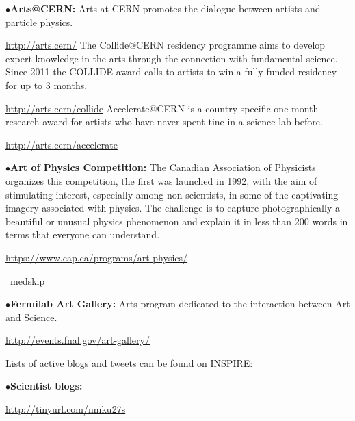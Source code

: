 

\medskip

\item{$\bullet$}{\bf Arts@CERN:}
Arts at CERN promotes the dialogue between artists and particle physics.
	\item{}\qquad\url{http://arts.cern/}
The Collide@CERN residency programme aims to develop expert knowledge in the arts through the connection with fundamental science. Since 2011 the COLLIDE award calls to artists to win a fully funded residency for up to 3 months.
	\item{}\qquad\url{http://arts.cern/collide}
Accelerate@CERN is a country specific one-month research award for artists who have never spent tine in a science lab before.
	\item{}\qquad\url{http://arts.cern/accelerate}


\medskip

\item{$\bullet$}{\bf Art of Physics Competition:}
The Canadian Association of Physicists organizes this competition, the first was launched in 1992, with the aim of stimulating interest, especially among non-scientists, in some of the captivating imagery associated with physics. The challenge is to capture photographically a beautiful or unusual physics phenomenon and explain it in less than 200 words in terms that everyone can understand.
	\item{}\qquad\url{https://www.cap.ca/programs/art-physics/}

\ medskip

\item{$\bullet$}{\bf Fermilab Art Gallery:}
Arts program dedicated to the interaction between Art and Science.
	\item{}\qquad\url{http://events.fnal.gov/art-gallery/}


\medskip


\medskip

Lists of active blogs and tweets can be found on INSPIRE:

\item{$\bullet$}{\bf Scientist blogs:}
	\item{}\qquad\url{http://tinyurl.com/nmku27s}

